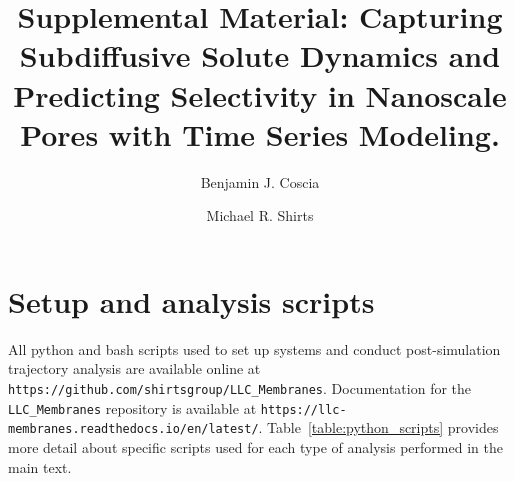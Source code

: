 \documentclass{article}
\title{Supplemental Material: Capturing Subdiffusive Solute Dynamics and 
Predicting Selectivity in Nanoscale Pores with Time Series Modeling.}
\author{Benjamin J. Coscia \and Michael R. Shirts}
\begin{document}
  \maketitle
  \tableofcontents
  \graphicspath{{./supporting_figures/}}
  
  
  \newpage  
  
  \section{Setup and analysis scripts}\label{section:python_scripts}

  All python and bash scripts used to set up systems and conduct post-simulation trajectory
  analysis are available online at \texttt{https://github.com/shirtsgroup/LLC\_Membranes}.
  Documentation for the \texttt{LLC\_Membranes} repository is available at
  \texttt{https://llc-membranes.readthedocs.io/en/latest/}. Table~\ref{table:python_scripts}
  provides more detail about specific scripts used for each type of analysis performed in
  the main text.
\end{document}
